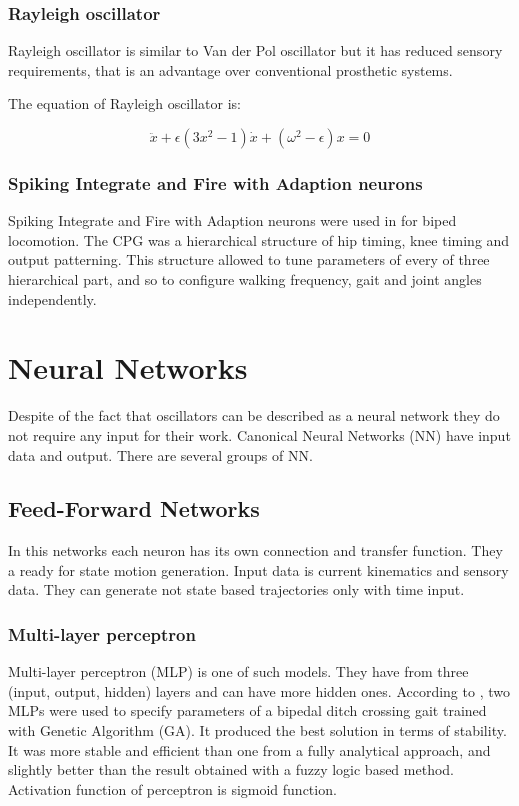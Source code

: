 \documentclass[12pt,a4paper]{report}
\begin{document}
			\subsubsection{Rayleigh oscillator}
				Rayleigh oscillator is similar to Van der Pol oscillator but it has reduced sensory requirements, that is an advantage over conventional prosthetic systems.
				
				The equation of Rayleigh oscillator is:
				
				\begin{equation}\label{eq:Rel1}
					\ddot{x} + \epsilon(3x^2 - 1)\dot{x} + (\omega^2 - \epsilon)x = 0
				\end{equation}
			\subsubsection{Spiking Integrate and Fire with Adaption neurons}
				Spiking Integrate and Fire with Adaption neurons were used in \cite{russell2007configuring} for biped locomotion. The CPG was a hierarchical structure of hip timing, knee timing and output patterning. This structure allowed to tune parameters of every of three hierarchical part, and so to configure walking frequency, gait and joint angles independently.
		\section{Neural Networks}
		Despite of the fact that oscillators can be described as a neural network they do not require any input for their work. Canonical Neural Networks (NN) have input data and output. There are several groups of NN.

			\subsection{Feed-Forward Networks}
				In this networks each neuron has its own connection and transfer function. They a ready for state motion generation.  Input data is current kinematics and sensory data. They can generate not state based trajectories only with time input. 
				\subsubsection{Multi-layer perceptron}
					Multi-layer perceptron (MLP) is one of such models. They have from three (input, output, hidden) layers and can have more hidden ones. According to \cite{vundavilli2010dynamically}, two MLPs were used to specify parameters of a bipedal ditch crossing gait trained with Genetic Algorithm (GA). It produced the best solution in terms of stability. It was more stable and efficient than one from a fully analytical approach, and slightly better than the result obtained with a fuzzy logic based method. Activation function of perceptron is sigmoid function.
\end{document}
